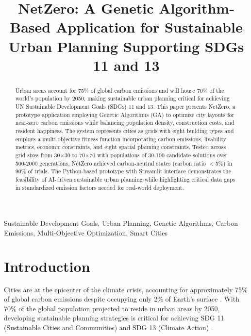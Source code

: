 \documentclass[conference]{IEEEtran}
\begin{document}
\title{NetZero: A Genetic Algorithm-Based Application for Sustainable Urban Planning Supporting SDGs 11 and 13}

\author{
}

\maketitle

\begin{abstract}
Urban areas account for 75\% of global carbon emissions and will house 70\% of the world's population by 2050, making sustainable urban planning critical for achieving UN Sustainable Development Goals (SDGs) 11 and 13. This paper presents NetZero, a prototype application employing Genetic Algorithms (GA) to optimize city layouts for near-zero carbon emissions while balancing population density, construction costs, and resident happiness. The system represents cities as grids with eight building types and employs a multi-objective fitness function incorporating carbon emissions, livability metrics, economic constraints, and eight spatial planning constraints. Tested across grid sizes from 30$\times$30 to 70$\times$70 with populations of 30-100 candidate solutions over 500-2000 generations, NetZero achieved carbon-neutral states (carbon ratio $<$5\%) in 90\% of trials. The Python-based prototype with Streamlit interface demonstrates the feasibility of AI-driven sustainable urban planning while highlighting critical data gaps in standardized emission factors needed for real-world deployment.
\end{abstract}

\begin{IEEEkeywords}
Sustainable Development Goals, Urban Planning, Genetic Algorithms, Carbon Emissions, Multi-Objective Optimization, Smart Cities
\end{IEEEkeywords}

\section{Introduction}

Cities are at the epicenter of the climate crisis, accounting for approximately 75\% of global carbon emissions despite occupying only 2\% of Earth's surface \cite{UN2018}. With 70\% of the global population projected to reside in urban areas by 2050, developing sustainable planning strategies is critical for achieving SDG 11 (Sustainable Cities and Communities) and SDG 13 (Climate Action) \cite{SDG2030}.
\end{document}
